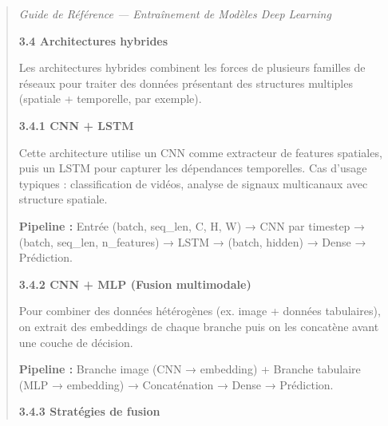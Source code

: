 \documentclass[
]{article}
\begin{document}
\begin{quote}
\emph{Guide de Référence --- Entraînement de Modèles Deep Learning}

\textbf{3.4 Architectures hybrides}

Les architectures hybrides combinent les forces de plusieurs familles de
réseaux pour traiter des données présentant des structures multiples
(spatiale + temporelle, par exemple).

\textbf{3.4.1 CNN + LSTM}

Cette architecture utilise un CNN comme extracteur de features
spatiales, puis un LSTM pour capturer les dépendances temporelles. Cas
d'usage typiques : classification de vidéos, analyse de signaux
multicanaux avec structure spatiale.

\textbf{Pipeline :} Entrée (batch, seq\_len, C, H, W) → CNN par timestep
→ (batch, seq\_len, n\_features) → LSTM → (batch, hidden) → Dense →
Prédiction.

\textbf{3.4.2 CNN + MLP (Fusion multimodale)}

Pour combiner des données hétérogènes (ex. image + données tabulaires),
on extrait des embeddings de chaque branche puis on les concatène avant
une couche de décision.

\textbf{Pipeline :} Branche image (CNN → embedding) + Branche tabulaire
(MLP → embedding) → Concaténation → Dense → Prédiction.

\textbf{3.4.3 Stratégies de fusion}
\end{quote}
\end{document}
